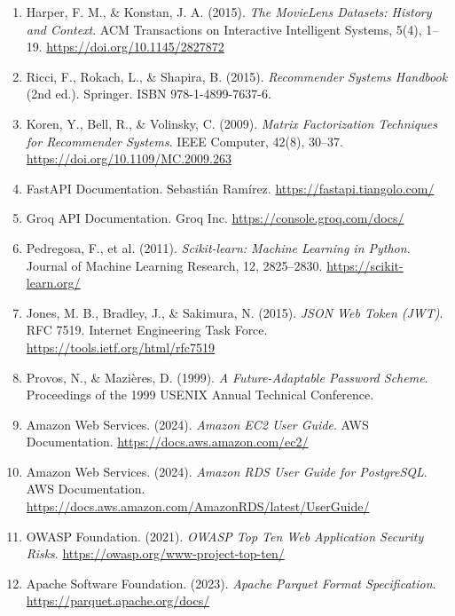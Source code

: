 \documentclass[12pt,a4paper]{report}
\begin{document}
\begin{enumerate}
    \item Harper, F. M., \& Konstan, J. A. (2015). \textit{The MovieLens Datasets: History and Context}. ACM Transactions on Interactive Intelligent Systems, 5(4), 1--19. \url{https://doi.org/10.1145/2827872}

    \item Ricci, F., Rokach, L., \& Shapira, B. (2015). \textit{Recommender Systems Handbook} (2nd ed.). Springer. ISBN 978-1-4899-7637-6.

    \item Koren, Y., Bell, R., \& Volinsky, C. (2009). \textit{Matrix Factorization Techniques for Recommender Systems}. IEEE Computer, 42(8), 30--37. \url{https://doi.org/10.1109/MC.2009.263}

    \item FastAPI Documentation. Sebastián Ramírez. \url{https://fastapi.tiangolo.com/}

    \item Groq API Documentation. Groq Inc. \url{https://console.groq.com/docs/}

    \item Pedregosa, F., et al. (2011). \textit{Scikit-learn: Machine Learning in Python}. Journal of Machine Learning Research, 12, 2825--2830. \url{https://scikit-learn.org/}

    \item Jones, M. B., Bradley, J., \& Sakimura, N. (2015). \textit{JSON Web Token (JWT)}. RFC 7519. Internet Engineering Task Force. \url{https://tools.ietf.org/html/rfc7519}

    \item Provos, N., \& Mazières, D. (1999). \textit{A Future-Adaptable Password Scheme}. Proceedings of the 1999 USENIX Annual Technical Conference.

    \item Amazon Web Services. (2024). \textit{Amazon EC2 User Guide}. AWS Documentation. \url{https://docs.aws.amazon.com/ec2/}

    \item Amazon Web Services. (2024). \textit{Amazon RDS User Guide for PostgreSQL}. AWS Documentation. \url{https://docs.aws.amazon.com/AmazonRDS/latest/UserGuide/}

    \item OWASP Foundation. (2021). \textit{OWASP Top Ten Web Application Security Risks}. \url{https://owasp.org/www-project-top-ten/}

    \item Apache Software Foundation. (2023). \textit{Apache Parquet Format Specification}. \url{https://parquet.apache.org/docs/}
\end{enumerate}
\end{document}
